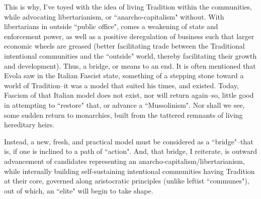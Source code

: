 \begin{footnotesize}
\begin{sffamily}
This is why, I've toyed with the idea of living Tradition within the communities, while advocating libertarianism, or ``anarcho-capitalism" without. With libertarians in outside ``public office", comes a weakening of state and enforcement power, as well as a positive deregulation of business such that larger economic wheels are greased (better facilitating trade between the Traditional intentional communities and the ``outside" world, thereby facilitating their growth and development). Thus, a bridge, or means to an end. It is often mentioned that Evola saw in the Italian Fascist state, something of a stepping stone toward a world of Tradition–it was a model that suited his times, and existed. Today, Fascism of that Italian model does not exist, nor will return again–so, little good in attempting to ``restore" that, or advance a ``Mussolinism". Nor shall we see, some sudden return to monarchies, built from the tattered remnants of living hereditary heirs. 

Instead, a new, fresh, and practical model must be considered as a ``bridge"–that is, if one is inclined to a path of ``action". And, that bridge, I reiterate, is outward advancement of candidates representing an anarcho-capitalism/libertarianism, while internally building self-sustaining intentional communities having Tradition at their core, governed along aristocratic principles (unlike leftist ``communes"), out of which, an ``elite" will begin to take shape.


\end{sffamily}\end{footnotesize}
